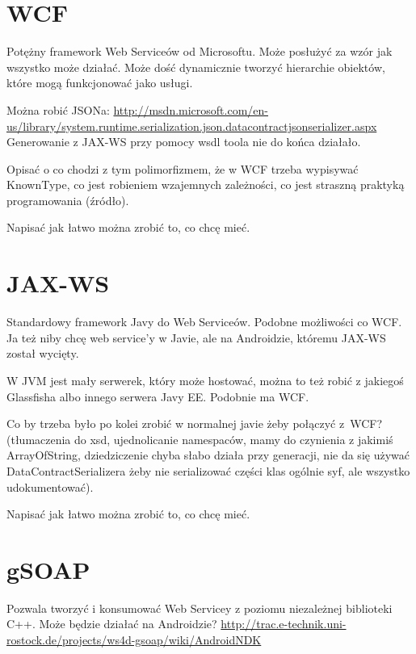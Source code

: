 \section{WCF}
Potężny framework Web Serviceów od Microsoftu. Może posłużyć za wzór jak wszystko może działać. Może dość dynamicznie tworzyć hierarchie obiektów, które mogą funkcjonować jako usługi.

Można robić JSONa: \url{http://msdn.microsoft.com/en-us/library/system.runtime.serialization.json.datacontractjsonserializer.aspx}\\

Generowanie z JAX-WS przy pomocy wsdl toola nie do końca działało.

Opisać o co chodzi z tym polimorfizmem, że w WCF trzeba wypisywać KnownType, co jest robieniem wzajemnych zależności, co jest straszną praktyką programowania (źródło).

Napisać jak łatwo można zrobić to, co chcę mieć.



\section{JAX-WS}
Standardowy framework Javy do Web Serviceów. Podobne możliwości co WCF\@. Ja też niby chcę web service'y w Javie, ale na Androidzie, któremu JAX-WS został wycięty.

W JVM jest mały serwerek, który może hostować, można to też robić z jakiegoś Glassfisha albo innego serwera Javy EE\@. Podobnie ma WCF.

Co by trzeba było po kolei zrobić w normalnej javie żeby połączyć z~WCF? (tłumaczenia do xsd, ujednolicanie namespaców, mamy do czynienia z jakimiś ArrayOfString, dziedziczenie chyba słabo działa przy generacji, nie da się używać DataContractSerializera żeby nie serializować części klas ogólnie syf, ale wszystko udokumentować). 

Napisać jak łatwo można zrobić to, co chcę mieć.



\section{gSOAP}
Pozwala tworzyć i konsumować Web Servicey z poziomu niezależnej biblioteki C++. Może będzie działać na Androidzie?
\url{http://trac.e-technik.uni-rostock.de/projects/ws4d-gsoap/wiki/AndroidNDK}\\



